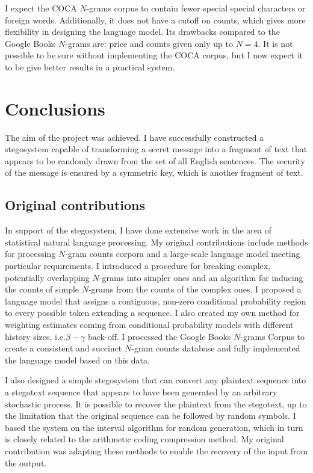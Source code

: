 \documentclass[draft]{IIBproject}
\makeatletter
\DeclareRobustCommand*{\ie}{i.e.\@\xspace}
\makeatother
\begin{document}
I expect the COCA $N$-grams corpus to contain fewer special special characters or foreign words. Additionally, it does not have a cutoff on counts, which gives more flexibility in designing the language model. Its drawbacks compared to the Google Books $N$-grams are: price and counts given only up to $N=4$. It is not possible to be sure without implementing the COCA corpus, but I now expect it to be give better results in a practical system.

\cleardoublepage
\section{Conclusions}

The aim of the project was achieved. I have successfully constructed a stegosystem capable of transforming a secret message into a fragment of text that appears to be randomly drawn from the set of all English sentences. The security of the message is ensured by a symmetric key, which is another fragment of text.

\subsection{Original contributions}

In support of the stegosystem, I have done extensive work in the area of statistical natural language processing. My original contributions include methods for processing $N$-gram counts corpora and a large-scale language model meeting particular requirements. I introduced a procedure for breaking complex, potentially overlapping $N$-grams into simpler ones and an algorithm for inducing the counts of simple $N$-grams from the counts of the complex ones. I proposed a language model that assigns a contiguous, non-zero conditional probability region to every possible token extending a sequence. I also created my own method for weighting estimates coming from conditional probability models with different history sizes, \ie $\beta{-}\gamma$ back-off. I processed the Google Books $N$-grams Corpus to create a consistent and succinct $N$-gram counts database and fully implemented the language model based on this data.

I also designed a simple stegosystem that can convert any plaintext sequence into a stegotext sequence that appears to have been generated by an arbitrary stochastic process. It is possible to recover the plaintext from the stegotext, up to the limitation that the original sequence can be followed by random symbols. I based the system on the interval algorithm for random generation, which in turn is closely related to the arithmetic coding compression method. My original contribution was adapting these methods to enable the recovery of the input from the output.
\end{document}
